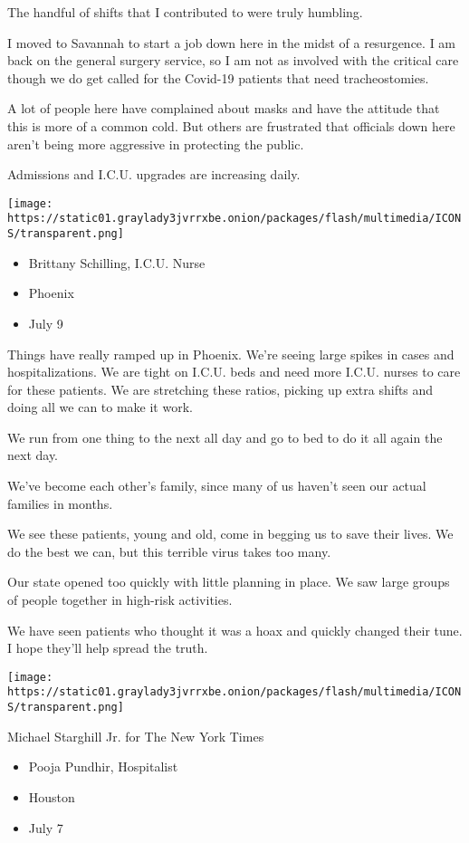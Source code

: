 The handful of shifts that I contributed to were truly humbling.

I moved to Savannah to start a job down here in the midst of a
resurgence. I am back on the general surgery service, so I am not as
involved with the critical care though we do get called for the Covid-19
patients that need tracheostomies.

A lot of people here have complained about masks and have the attitude
that this is more of a common cold. But others are frustrated that
officials down here aren't being more aggressive in protecting the
public.

Admissions and I.C.U. upgrades are increasing daily.

\texttt{[image: https://static01.graylady3jvrrxbe.onion/packages/flash/multimedia/ICONS/transparent.png]}

\begin{itemize}
\tightlist
\item
  Brittany Schilling, I.C.U. Nurse
\item
  Phoenix
\item
  July 9
\end{itemize}

Things have really ramped up in Phoenix. We're seeing large spikes in
cases and hospitalizations. We are tight on I.C.U. beds and need more
I.C.U. nurses to care for these patients. We are stretching these
ratios, picking up extra shifts and doing all we can to make it work.

We run from one thing to the next all day and go to bed to do it all
again the next day.

We've become each other's family, since many of us haven't seen our
actual families in months.

We see these patients, young and old, come in begging us to save their
lives. We do the best we can, but this terrible virus takes too many.

Our state opened too quickly with little planning in place. We saw large
groups of people together in high-risk activities.

We have seen patients who thought it was a hoax and quickly changed
their tune. I hope they'll help spread the truth.

\texttt{[image: https://static01.graylady3jvrrxbe.onion/packages/flash/multimedia/ICONS/transparent.png]}

Michael Starghill Jr. for The New York Times

\begin{itemize}
\tightlist
\item
  Pooja Pundhir, Hospitalist
\item
  Houston
\item
  July 7
\end{itemize}


